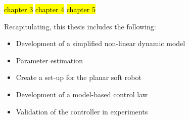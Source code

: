 \hl{chapter 3}
\hl{chapter 4}
\hl{chapter 5}


Recapitulating, this thesis includes the following:


\begin{itemize}
    \item Development of a simplified non-linear dynamic model
    \item Parameter estimation
    \item Create a set-up for the planar soft robot 
    \item Development of a model-based control law
    \item Validation of the controller in experiments
\end{itemize}
